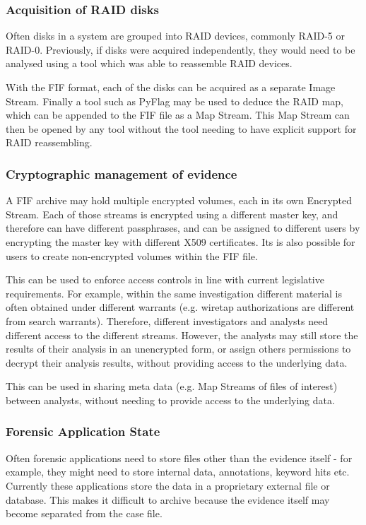 \documentclass[10pt, conference]{IEEEtran}
\begin{document}
\subsubsection{Acquisition of RAID disks}
Often disks in a system are grouped into RAID devices, commonly RAID-5
or RAID-0. Previously, if disks were acquired independently, they
would need to be analysed using a tool which was able to reassemble
RAID devices.

With the FIF format, each of the disks can be acquired as a separate
Image Stream. Finally a tool such as PyFlag may be used to deduce the
RAID map, which can be appended to the FIF file as a Map Stream. This
Map Stream can then be opened by any tool without the tool needing to
have explicit support for RAID reassembling.

\subsubsection{Cryptographic management of evidence}
A FIF archive may hold multiple encrypted volumes, each in its own
Encrypted Stream. Each of those streams is encrypted using a different
master key, and therefore can have different passphrases, and can be
assigned to different users by encrypting the master key with
different X509 certificates. Its is also possible for users to create
non-encrypted volumes within the FIF file.

This can be used to enforce access controls in line with current
legislative requirements. For example, within the same investigation
different material is often obtained under different warrants
(e.g. wiretap authorizations are different from search
warrants). Therefore, different investigators and analysts need
different access to the different streams. However, the analysts may
still store the results of their analysis in an unencrypted form, or
assign others permissions to decrypt their analysis results, without
providing access to the underlying data. 

This can be used in sharing meta data (e.g. Map Streams of files of
interest) between analysts, without needing to provide access to the
underlying data.

\subsubsection{Forensic Application State}
Often forensic applications need to store files other than the
evidence itself - for example, they might need to store internal data,
annotations, keyword hits etc. Currently these applications store the
data in a proprietary external file or database. This makes it
difficult to archive because the evidence itself may become separated
from the case file.
\end{document}
